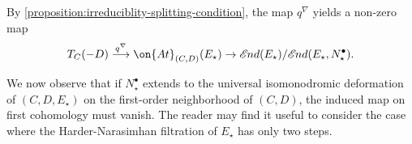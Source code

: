 \documentclass[12 pt]{amsart}
\newcommand\reallywidehat[1]{%
\savestack{\tmpbox}{\stretchto{%
  \scaleto{%
    \scalerel*[\widthof{\ensuremath{#1}}]{\kern-.6pt\bigwedge\kern-.6pt}%
    {\rule[-\textheight/2]{1ex}{\textheight}}%
  }{\textheight}%
}{0.5ex}}%
\stackon[1pt]{#1}{\tmpbox}%
}
\theoremstyle{plain}
\theoremstyle{definition}
\newtheorem{remark}[subsubsection]{Remark}
\theoremstyle{remark}
\numberwithin{equation}{section}
\newcommand*{\sheafend}{\mathscr{E}\kern -1pt nd}
\begin{document}
%


By \autoref{proposition:irreduciblity-splitting-condition},
the map $q^\nabla$ yields a non-zero map 
\begin{align}\label{q-nabla-map}
	T_C(-D)\overset{q^\nabla}\longrightarrow
\on{At}_{(C,D)}(E_\star) \to
\sheafend(E_\star)/\sheafend(E_\star, N_\star^\bullet).
\end{align}

We now observe that if $N_\star^\bullet$ extends to the universal isomonodromic deformation of
$(C,D, E_\star)$ on the first-order neighborhood of $(C,D)$, the induced map on first cohomology must vanish. The reader may find it useful to consider the case where the Harder-Narasimhan filtration of $E_\star$ has only two steps.
\end{document}
